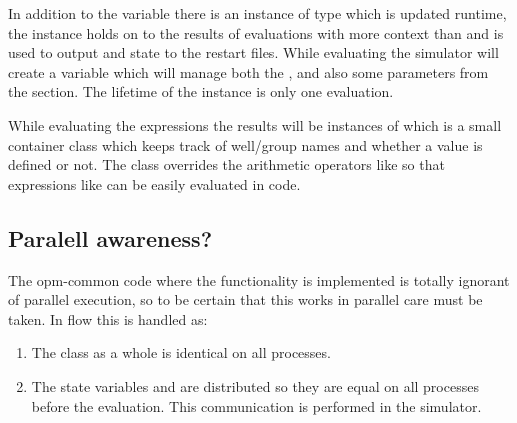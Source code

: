 In addition to the  variable there is an instance of
type  which is updated runtime, the 
instance holds on to the results of \udq{} evaluations with more context than
 and is used to output \udq{} and  state to the
restart files. While evaluating the simulator will create a 
variable which will manage both the ,
 and also some \udq{} parameters from the 
section. The lifetime of the  instance is only one \udq{}
evaluation.

While evaluating the \udq{} expressions the results will be instances of
 which is a small container class which keeps track of
well/group names and whether a value is defined or not. The 
class overrides the arithmetic operators like 
so that expressions like  can be easily evaluated in code.

\subsection*{Paralell awareness?}
The opm-common code where the \udq{} functionality is implemented is totally
ignorant of parallel execution, so to be certain that this works in parallel
care must be taken. In flow this is handled as:
\begin{enumerate}
  \item The  class as a whole is identical on all
    processes.
  \item The state variables  and 
    are distributed so they are equal on all processes before the \udq{}
    evaluation. This communication is performed in the simulator.
\end{enumerate}




